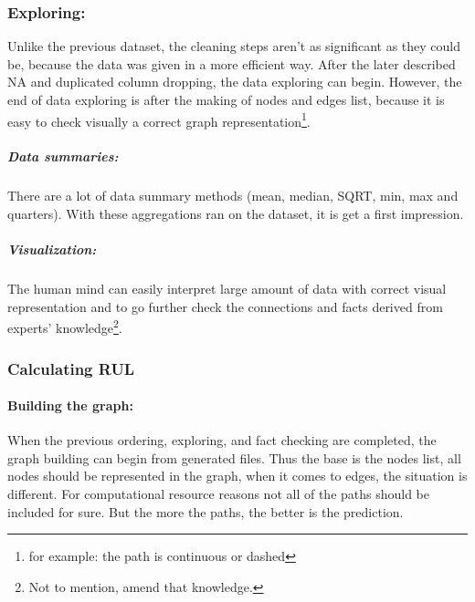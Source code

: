 		\subsubsection{Exploring:}
			Unlike the previous dataset, the cleaning steps aren't as significant as they could be, because the data was given in a more efficient way. After the later described NA and duplicated column dropping, the data exploring can begin. However, the end of data exploring is after the making of nodes and edges list, because it is easy to check visually a correct graph representation\footnote{for example: the path is continuous or dashed}.
			\subparagraph{Data summaries:}
			There are a lot of data summary methods (mean, median, SQRT, min, max and quarters). With these aggregations ran on the dataset, it is get a first impression. 
			\subparagraph{Visualization:}
			The human mind can easily interpret large amount of data with correct visual representation and to go further check the connections and facts derived from experts' knowledge\footnote{Not to mention, amend that knowledge.}.
		\subsubsection{Calculating RUL}
			\paragraph{Building the graph:}
			When the previous ordering, exploring, and fact checking are completed, the graph building can begin from generated files. Thus the base is the nodes list, all nodes should be represented in the graph, when it comes to edges, the situation is different. For computational resource reasons not all of the paths should be included for sure. But the more the paths, the better is the prediction.
